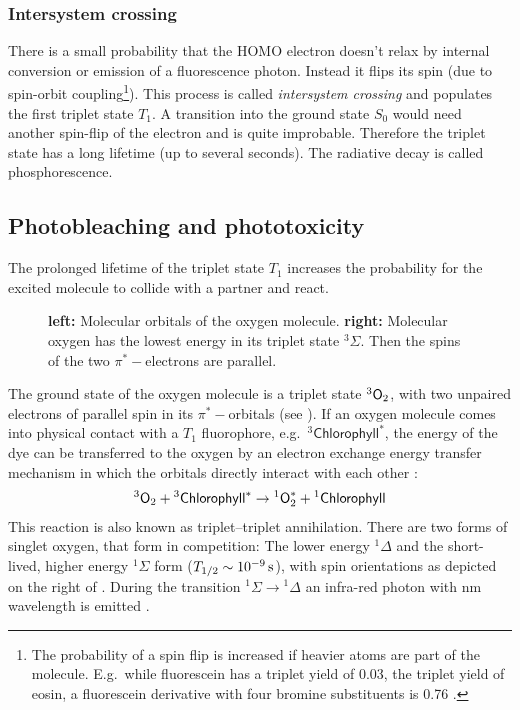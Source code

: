 \subsubsection{Intersystem crossing}
There is a small probability that the HOMO electron doesn't relax by
internal conversion or emission of a fluorescence photon. Instead it
flips its spin (due to spin-orbit coupling\footnote{The probability of
  a spin flip is increased if heavier atoms are part of the
  molecule. E.g.\ while fluorescein has a triplet yield of 0.03, the
  triplet yield of eosin, a fluorescein derivative with four bromine
  substituents is 0.76 \citep[p.~37]{Sauer2011}.}). This process is
called \emph{intersystem crossing} and populates the first triplet
state $T_1$. A transition into the ground state $S_0$ would need
another spin-flip of the electron and is quite improbable. Therefore
the triplet state has a long lifetime (up to several seconds). The
radiative decay is called phosphorescence.
  

\subsection{Photobleaching and phototoxicity}
The prolonged lifetime of the triplet state $T_1$ increases the
probability for the excited molecule to collide with a partner and
react.

\begin{figure}[!hbt]
  \centering
  
  \caption{{\bf left:} Molecular orbitals of the oxygen molecule. {\bf
      right:} Molecular oxygen has the lowest energy in its triplet
    state ${}^3\Sigma$. Then the spins of the two $\pi^*-$electrons
    are parallel.}
  \label{fig:oxygen}
\end{figure}


The ground state of the oxygen molecule is a triplet state ${}^3\textsf{O}_2$,
with two unpaired electrons of parallel spin in its $\pi^*-$orbitals
(see ).  If an oxygen molecule comes into physical
contact with a $T_1$ fluorophore, e.g.\ ${}^3\textsf{Chlorophyll}^*$,
the energy of the dye can be transferred to the oxygen by an electron
exchange energy transfer mechanism in which the orbitals directly
interact with each other \citetext{\citealp[p.~438]{Haken2006} and
  \citealp{Linde2011a}}:
\begin{align}
  {}^3\textsf{O}_2 + {}^3\textsf{Chlorophyll}^* \rightarrow
  {}^1\textsf{O}^*_2+{}^1\textsf{Chlorophyll}
\end{align}
This reaction is also known as triplet--triplet annihilation.  There
are two forms of singlet oxygen, that form in competition: The lower
energy ${}^1\Delta$ and the short-lived, higher energy ${}^1\Sigma$
form ($T_{1/2}\sim\unit[10^{-9}]{s}$), with spin orientations as
depicted on the right of . During the transition
${}^1\Sigma\rightarrow{}^1\Delta$ an infra-red photon with
\unit[1268]{nm} wavelength is emitted \citep[p.~20]{Linde2011a}.

